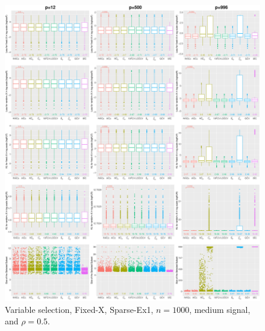 \begin{figure}[!ht]
\centering
\includegraphics[width=\textwidth]{figures/supplement/fixedx/subset_selection/Sparse-Ex1_n1000_msnr_rho05.eps}
\caption{Variable selection, Fixed-X, Sparse-Ex1, $n=1000$, medium signal, and $\rho=0.5$.}
\end{figure}
\clearpage

